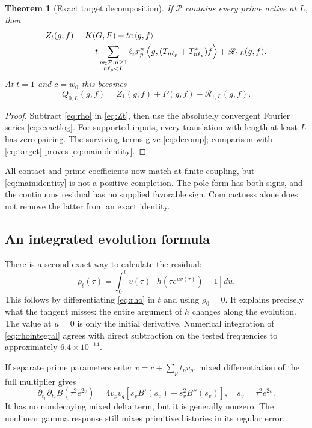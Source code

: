 \documentclass[11pt]{article}
\numberwithin{equation}{section}
\newtheorem{theorem}{Theorem}[section]
\theoremstyle{definition}
\theoremstyle{remark}
\newcommand{\ip}[2]{\left\langle#1,#2\right\rangle}
\begin{document}
\begin{theorem}[Exact target decomposition]
If $\mathcal P$ contains every prime active at $L$, then
\begin{align}
 Z_t(g,f)={}&K(G,F)+tc\ip{g}{f}\notag\\
 &-t\sum_{\substack{p\in\mathcal P,n\ge1\\n\ell_p<L}}
 \ell_pr_p^n\ip{g}{(T_{n\ell_p}+T_{n\ell_p}^*)f}
 +\mathscr R_{t,L}(g,f).
 \label{eq:decomp}
\end{align}
At $t=1$ and $c=w_0$ this becomes
\begin{equation}
 \boxed{Q_{0,L}(g,f)=Z_1(g,f)+P(g,f)-\mathscr R_{1,L}(g,f).}
 \label{eq:mainidentity}
\end{equation}
\end{theorem}
\begin{proof}
Subtract \eqref{eq:rho} in \eqref{eq:Zt}, then use the absolutely convergent Fourier series \eqref{eq:exactlog}. For supported inputs, every translation with length at least $L$ has zero pairing. The surviving terms give \eqref{eq:decomp}; comparison with \eqref{eq:target} proves \eqref{eq:mainidentity}.
\end{proof}
All contact and prime coefficients now match at finite coupling, but \eqref{eq:mainidentity} is not a positive completion. The pole form has both signs, and the continuous residual has no supplied favorable sign. Compactness alone does not remove the latter from an exact identity.

\subsection{An integrated evolution formula}
There is a second exact way to calculate the residual:
\begin{equation}
 \rho_t(\tau)=\int_0^t v(\tau)
 \left[h(\tau e^{uv(\tau)})-1\right]du.
 \label{eq:rhointegral}
\end{equation}
This follows by differentiating \eqref{eq:rho} in $t$ and using $\rho_0=0$. It explains precisely what the tangent misses: the entire argument of $h$ changes along the evolution. The value at $u=0$ is only the initial derivative. Numerical integration of \eqref{eq:rhointegral} agrees with direct subtraction on the tested frequencies to approximately $6.4\times10^{-14}$.

If separate prime parameters enter $v=c+\sum_pt_pv_p$, mixed differentiation of the full multiplier gives
\begin{equation}
 \partial_{t_p}\partial_{t_q} B(\tau^2e^{2v})
 =4v_pv_q\left[s_vB'(s_v)+s_v^2B''(s_v)\right],
 \quad s_v=\tau^2e^{2v}.
\end{equation}
It has no nondecaying mixed delta term, but it is generally nonzero. The nonlinear gamma response still mixes primitive histories in its regular error.
\end{document}
